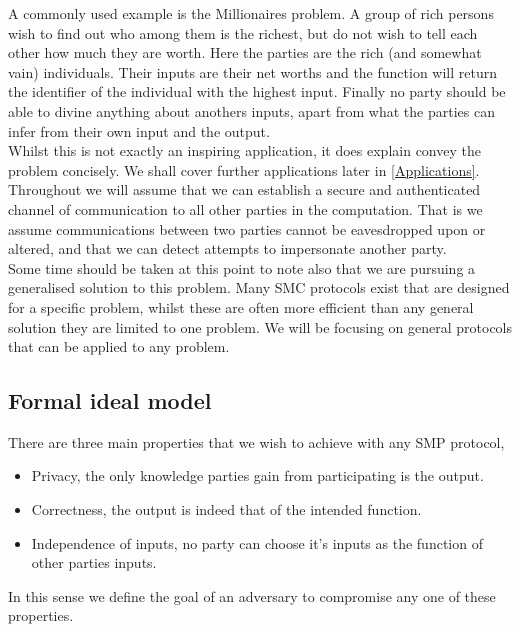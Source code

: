 \documentclass[a4paper,10pt]{article}
\begin{document}
			A commonly used example is the Millionaires problem. A group of rich persons wish to find out who among them is the richest, but do not wish to tell each other how much they are worth. Here the parties are the rich (and somewhat vain) individuals. Their inputs are their net worths and the function will return the identifier of the individual with the highest input. Finally no party should be able to divine anything about anothers inputs, apart from what the parties can infer from their own input and the output.\\
      
			Whilst this is not exactly an inspiring application, it does explain convey the problem concisely. We shall cover further applications later in \ref{Applications}.\\

			Throughout we will assume that we can establish a secure and authenticated channel of communication to all other parties in the computation. That is we assume communications between two parties cannot be eavesdropped upon or altered, and that we can detect attempts to impersonate another party.\\

			Some time should be taken at this point to note also that we are pursuing a generalised solution to this problem. Many SMC protocols exist that are designed for a specific problem, whilst these are often more efficient than any general solution they are limited to one problem. We will be focusing on general protocols that can be applied to any problem.


		\subsection{Formal ideal model}
			There are three main properties that we wish to achieve with any SMP protocol,
			\begin{itemize}
				\item Privacy, the only knowledge parties gain from participating is the output.
				\item Correctness, the output is indeed that of the intended function.
				\item Independence of inputs, no party can choose it's inputs as the function of other parties inputs.
			\end{itemize}

			In this sense we define the goal of an adversary to compromise any one of these properties.\\
\end{document}
